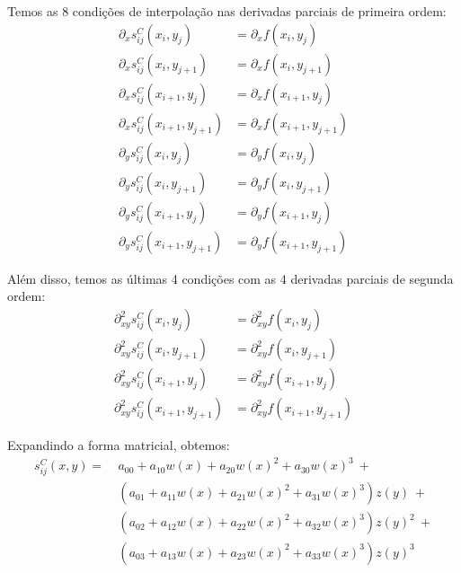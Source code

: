\documentclass[a4paper, 12pt]{article}
\begin{document}
Temos as 8 condições de interpolação nas derivadas parciais de primeira ordem:
\begin{align}
    \partial_{x}s_{ij}^C(x_{i}, y_{j})      &= \partial_{x}f(x_{i}, y_{j}) \tag{5}      \\
    \partial_{x}s_{ij}^C(x_{i}, y_{j+1})    &= \partial_{x}f(x_{i}, y_{j+1}) \tag{6}    \\
    \partial_{x}s_{ij}^C(x_{i+1}, y_{j})    &= \partial_{x}f(x_{i+1}, y_{j}) \tag{7}    \\
    \partial_{x}s_{ij}^C(x_{i+1}, y_{j+1})  &= \partial_{x}f(x_{i+1}, y_{j+1}) \tag{8}  \\
    \partial_{y}s_{ij}^C(x_{i}, y_{j})      &= \partial_{y}f(x_{i}, y_{j}) \tag{9}      \\
    \partial_{y}s_{ij}^C(x_{i}, y_{j+1})    &= \partial_{y}f(x_{i}, y_{j+1}) \tag{10}   \\
    \partial_{y}s_{ij}^C(x_{i+1}, y_{j})    &= \partial_{y}f(x_{i+1}, y_{j}) \tag{11}   \\
    \partial_{y}s_{ij}^C(x_{i+1}, y_{j+1})  &= \partial_{y}f(x_{i+1}, y_{j+1}) \tag{12}
\end{align}

Além disso, temos as últimas 4 condições com as 4 derivadas parciais de segunda
ordem:
\begin{align}
    \partial_{xy}^{2}s_{ij}^C(x_{i}, y_{j})      &= \partial_{xy}^{2}f(x_{i}, y_{j}) \tag{13}      \\
    \partial_{xy}^{2}s_{ij}^C(x_{i}, y_{j+1})    &= \partial_{xy}^{2}f(x_{i}, y_{j+1}) \tag{14}    \\
    \partial_{xy}^{2}s_{ij}^C(x_{i+1}, y_{j})    &= \partial_{xy}^{2}f(x_{i+1}, y_{j}) \tag{15}    \\
    \partial_{xy}^{2}s_{ij}^C(x_{i+1}, y_{j+1})  &= \partial_{xy}^{2}f(x_{i+1}, y_{j+1}) \tag{16}
\end{align}

Expandindo a forma matricial, obtemos:
\begin{align*}
    s_{ij}^C(x,y) =\ &a_{00} + a_{10}w{(x)} + a_{20}w{(x)}^{2} + a_{30}w{(x)}^{3}\ +          \\ 
               &{(a_{01} + a_{11}w{(x)} + a_{21}w{(x)}^{2} + a_{31}w{(x)}^{3})}z{(y)}\ +     \\ 
               &{(a_{02} + a_{12}w{(x)} + a_{22}w{(x)}^{2} + a_{32}w{(x)}^{3})}z{(y)}^{2}\ + \\
               &{(a_{03} + a_{13}w{(x)} + a_{23}w{(x)}^{2} + a_{33}w{(x)}^{3})}z{(y)}^{3}
\end{align*}
\end{document}

